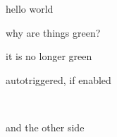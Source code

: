 \documentclass{article}
\begin{document}
hello world

why are things green?

it is no longer green

autotriggered, if enabled

\(\)

\lipsum[1-5]

and the other side
\end{document}
